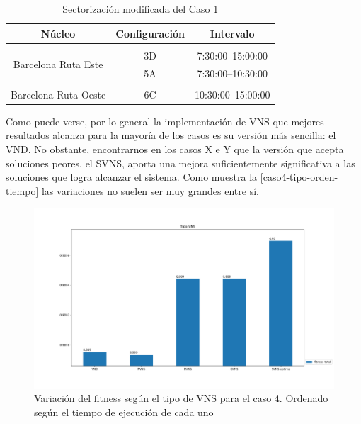 \begin{table}[h]
	\centering
	\caption{Sectorización modificada del Caso 1}
	\begin{tabular}{ccc}
		\hline
		\textbf{Núcleo}                                           & \textbf{Configuración} & \textbf{Intervalo}   \\ \hline
		\multicolumn{1}{l}{}                                      & \multicolumn{1}{l}{}   & \multicolumn{1}{l}{} \\
		\multicolumn{1}{c|}{\multirow{2}{*}{Barcelona Ruta Este}} & 3D                     & 7:30:00--15:00:00    \\
		\multicolumn{1}{c|}{}                                     & 5A                     & 7:30:00--10:30:00    \\
		\multicolumn{1}{l}{}                                      & \multicolumn{1}{l}{}   & \multicolumn{1}{l}{} \\
		Barcelona Ruta Oeste                                      & 6C                     & 10:30:00--15:00:00   \\ \hline
	\end{tabular}
	\label{table:5:tunning-results}
\end{table}

Como puede verse, por lo general la implementación de VNS que mejores resultados alcanza para la mayoría de los casos es su versión más sencilla: el VND. No obstante, encontrarnos en los casos X e Y %
que la versión que acepta soluciones peores, el SVNS, aporta una mejora suficientemente significativa a las soluciones que logra alcanzar el sistema. Como muestra la \autoref{caso4-tipo-orden-tiempo} las variaciones no suelen ser muy grandes entre sí.

\begin{figure}
	\centering
	\includegraphics[width=1\linewidth]{capitulos/Capitulo5-Resultados-experimentales/recursos/caso4-tipo-orden-tiempo}
	\caption{Variación del fitness según el tipo de VNS para el caso 4. Ordenado según el tiempo de ejecución de cada uno}
	\label{fig:caso4-tipo-orden-tiempo}
\end{figure}

